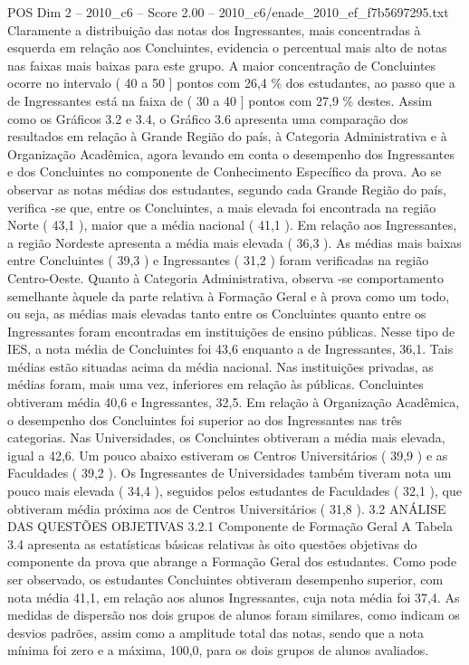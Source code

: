\begin{textsample}{POS Dim 2 – 2010\_c6 – Score 2.00 – 2010\_c6/enade\_2010\_ef\_f7b5697295.txt}
Claramente a distribuição das notas dos Ingressantes, mais concentradas à esquerda em relação aos Concluintes, evidencia o percentual mais alto de notas nas faixas mais baixas para este grupo.
A maior concentração de Concluintes ocorre no intervalo ( 40 a 50 ] pontos com 26,4 \% dos estudantes, ao passo que a de Ingressantes está na faixa de ( 30 a 40 ] pontos com 27,9 \% destes.
Assim como os Gráficos 3.2 e 3.4, o Gráfico 3.6 apresenta uma comparação dos resultados em relação à Grande Região do país, à Categoria Administrativa e à Organização Acadêmica, agora levando em conta o desempenho dos Ingressantes e dos Concluintes no componente de Conhecimento Específico da prova.
Ao se observar as notas médias dos estudantes, segundo cada Grande Região do país, verifica -se que, entre os Concluintes, a mais elevada foi encontrada na região Norte ( 43,1 ), maior que a média nacional ( 41,1 ).
Em relação aos Ingressantes, a região Nordeste apresenta a média mais elevada ( 36,3 ).
As médias mais baixas entre Concluintes ( 39,3 ) e Ingressantes ( 31,2 ) foram verificadas na região Centro-Oeste.
Quanto à Categoria Administrativa, observa -se comportamento semelhante àquele da parte relativa à Formação Geral e à prova como um todo, ou seja, as médias mais elevadas tanto entre os Concluintes quanto entre os Ingressantes foram encontradas em instituições de ensino públicas.
Nesse tipo de IES, a nota média de Concluintes foi 43,6 enquanto a de Ingressantes, 36,1.
Tais médias estão situadas acima da média nacional.
Nas instituições privadas, as médias foram, mais uma vez, inferiores em relação às públicas.
Concluintes obtiveram média 40,6 e Ingressantes, 32,5.
Em relação à Organização Acadêmica, o desempenho dos Concluintes foi superior ao dos Ingressantes nas três categorias.
Nas Universidades, os Concluintes obtiveram a média mais elevada, igual a 42,6.
Um pouco abaixo estiveram os Centros Universitários ( 39,9 ) e as Faculdades ( 39,2 ).
Os Ingressantes de Universidades também tiveram nota um pouco mais elevada ( 34,4 ), seguidos pelos estudantes de Faculdades ( 32,1 ), que obtiveram média próxima aos de Centros Universitários ( 31,8 ). 3.2 ANÁLISE DAS QUESTÕES OBJETIVAS 3.2.1 Componente de Formação Geral A Tabela 3.4 apresenta as estatísticas básicas relativas às oito questões objetivas do componente da prova que abrange a Formação Geral dos estudantes.
Como pode ser observado, os estudantes Concluintes obtiveram desempenho superior, com nota média 41,1, em relação aos alunos Ingressantes, cuja nota média foi 37,4.
As medidas de dispersão nos dois grupos de alunos foram similares, como indicam os desvios padrões, assim como a amplitude total das notas, sendo que a nota mínima foi zero e a máxima, 100,0, para os dois grupos de alunos avaliados.

\end{textsample}
